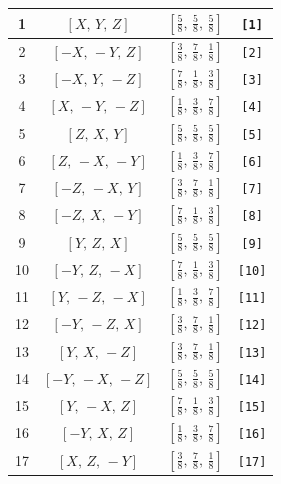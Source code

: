 \documentclass[fleqn,8pt]{jsarticle}
\begin{document}
\begin{longtable}{cccc}
1 & $\left[ X,\, Y,\, Z \right]$ & $\left[ \frac{5}{8},\, \frac{5}{8},\, \frac{5}{8} \right]$ & {\tt [1]} \\ \hline
2 & $\left[ - X,\, - Y,\, Z \right]$ & $\left[ \frac{3}{8},\, \frac{7}{8},\, \frac{1}{8} \right]$ & {\tt [2]} \\ \hline
3 & $\left[ - X,\, Y,\, - Z \right]$ & $\left[ \frac{7}{8},\, \frac{1}{8},\, \frac{3}{8} \right]$ & {\tt [3]} \\ \hline
4 & $\left[ X,\, - Y,\, - Z \right]$ & $\left[ \frac{1}{8},\, \frac{3}{8},\, \frac{7}{8} \right]$ & {\tt [4]} \\ \hline
5 & $\left[ Z,\, X,\, Y \right]$ & $\left[ \frac{5}{8},\, \frac{5}{8},\, \frac{5}{8} \right]$ & {\tt [5]} \\ \hline
6 & $\left[ Z,\, - X,\, - Y \right]$ & $\left[ \frac{1}{8},\, \frac{3}{8},\, \frac{7}{8} \right]$ & {\tt [6]} \\ \hline
7 & $\left[ - Z,\, - X,\, Y \right]$ & $\left[ \frac{3}{8},\, \frac{7}{8},\, \frac{1}{8} \right]$ & {\tt [7]} \\ \hline
8 & $\left[ - Z,\, X,\, - Y \right]$ & $\left[ \frac{7}{8},\, \frac{1}{8},\, \frac{3}{8} \right]$ & {\tt [8]} \\ \hline
9 & $\left[ Y,\, Z,\, X \right]$ & $\left[ \frac{5}{8},\, \frac{5}{8},\, \frac{5}{8} \right]$ & {\tt [9]} \\ \hline
10 & $\left[ - Y,\, Z,\, - X \right]$ & $\left[ \frac{7}{8},\, \frac{1}{8},\, \frac{3}{8} \right]$ & {\tt [10]} \\ \hline
11 & $\left[ Y,\, - Z,\, - X \right]$ & $\left[ \frac{1}{8},\, \frac{3}{8},\, \frac{7}{8} \right]$ & {\tt [11]} \\ \hline
12 & $\left[ - Y,\, - Z,\, X \right]$ & $\left[ \frac{3}{8},\, \frac{7}{8},\, \frac{1}{8} \right]$ & {\tt [12]} \\ \hline
13 & $\left[ Y,\, X,\, - Z \right]$ & $\left[ \frac{3}{8},\, \frac{7}{8},\, \frac{1}{8} \right]$ & {\tt [13]} \\ \hline
14 & $\left[ - Y,\, - X,\, - Z \right]$ & $\left[ \frac{5}{8},\, \frac{5}{8},\, \frac{5}{8} \right]$ & {\tt [14]} \\ \hline
15 & $\left[ Y,\, - X,\, Z \right]$ & $\left[ \frac{7}{8},\, \frac{1}{8},\, \frac{3}{8} \right]$ & {\tt [15]} \\ \hline
16 & $\left[ - Y,\, X,\, Z \right]$ & $\left[ \frac{1}{8},\, \frac{3}{8},\, \frac{7}{8} \right]$ & {\tt [16]} \\ \hline
17 & $\left[ X,\, Z,\, - Y \right]$ & $\left[ \frac{3}{8},\, \frac{7}{8},\, \frac{1}{8} \right]$ & {\tt [17]} \\ \hline

\end{longtable}
\end{document}
